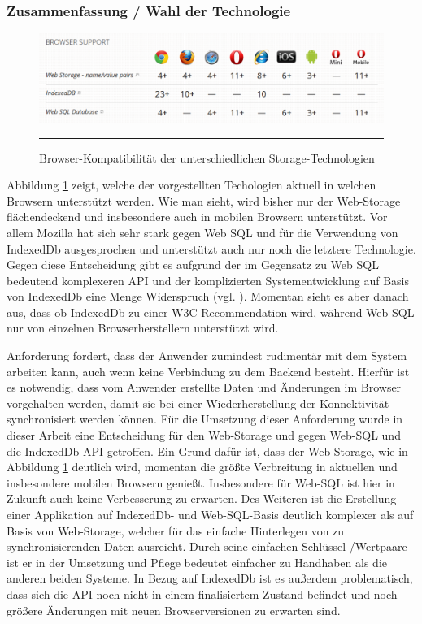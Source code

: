 \subsubsection*{Zusammenfassung / Wahl der Technologie}
\begin{figure}[ht]
  \centering
  \includegraphics[width=\textwidth,height=\textheight,keepaspectratio]{./Figures/storage_browser_compatibility.pdf}
    \rule{35em}{0.5pt}
  \caption[Storage Browser Kompatibilität]{Browser-Kompatibilität der unterschiedlichen Storage-Technologien}
  \label{fig:storage_browser_compatibility}
\end{figure}
Abbildung \ref{fig:storage_browser_compatibility} zeigt, welche der vorgestellten Techologien aktuell in welchen Browsern unterstützt werden. Wie man sieht, wird bisher nur der Web-Storage flächendeckend und insbesondere auch in mobilen Browsern unterstützt. Vor allem Mozilla hat sich sehr stark gegen Web SQL und für die Verwendung von IndexedDb ausgesprochen und unterstützt auch nur noch die letztere Technologie. Gegen diese Entscheidung gibt es aufgrund der im Gegensatz zu Web SQL bedeutend komplexeren API und der komplizierten Systementwicklung auf Basis von IndexedDb eine Menge Widerspruch (vgl. \cite{Ranganathan2010}). Momentan sieht es aber danach aus, dass ob IndexedDb zu einer W3C-Recommendation wird, während Web SQL nur von einzelnen Browserherstellern unterstützt wird.

Anforderung  fordert, dass der Anwender zumindest rudimentär mit dem System arbeiten kann, auch wenn keine Verbindung zu dem Backend besteht. Hierfür ist es notwendig, dass vom Anwender erstellte Daten und Änderungen im Browser vorgehalten werden, damit sie bei einer Wiederherstellung der Konnektivität synchronisiert werden können. Für die Umsetzung dieser Anforderung wurde in dieser Arbeit eine Entscheidung für den Web-Storage und gegen Web-SQL und die IndexedDb-API getroffen. Ein Grund dafür ist, dass der Web-Storage, wie in Abbildung \ref{fig:storage_browser_compatibility} deutlich wird, momentan die größte Verbreitung in aktuellen und insbesondere mobilen Browsern genießt. Insbesondere für Web-SQL ist hier in Zukunft auch keine Verbesserung zu erwarten. Des Weiteren ist die Erstellung einer Applikation auf IndexedDb- und Web-SQL-Basis deutlich komplexer als auf Basis von Web-Storage, welcher für das einfache Hinterlegen von zu synchronisierenden Daten ausreicht. Durch seine einfachen Schlüssel-/Wertpaare ist er in der Umsetzung und Pflege bedeutet einfacher zu Handhaben als die anderen beiden Systeme. In Bezug auf IndexedDb ist es außerdem problematisch, dass sich die API noch nicht in einem finalisiertem Zustand befindet und noch größere Änderungen mit neuen Browserversionen zu erwarten sind.

